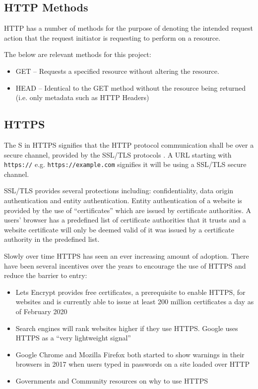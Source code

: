 \documentclass{mscreport}
\begin{document}
\subsection{HTTP Methods}

\noindent HTTP has a number of methods for the purpose of denoting the intended request action that the request initiator is requesting to perform on a resource.

\vspace{0.3cm} \noindent
The below are relevant methods for this project:
\begin{itemize}
	\setlength\itemsep{0.1em}
	\item GET – Requests a specified resource without altering the resource.
	\item HEAD – Identical to the GET method without the resource being returned (i.e. only metadata such as HTTP Headers)
\end{itemize}

\subsection{HTTPS}

\noindent
The S in HTTPS signifies that the HTTP protocol communication shall be over a secure channel, provided by the SSL/TLS protocols \cite{Rescorla2000-fs}. A URL starting with \texttt{https://} e.g. \texttt{https://example.com} signifies it will be using a SSL/TLS secure channel.

\vspace{0.3cm} \noindent 
SSL/TLS provides several protections including: confidentiality, data origin authentication and entity authentication. Entity authentication of a website is provided by the use of ``certificates'' which are issued by certificate authorities. A users' browser has a predefined list of certificate authorities that it trusts and a website certificate will only be deemed valid of it was issued by a certificate authority in the predefined list.


\vspace{0.3cm} \noindent
Slowly over time HTTPS has seen an ever increasing amount of adoption. There have been several incentives over the years to encourage the use of HTTPS and reduce the barrier to entry:

\begin{itemize}
	\setlength\itemsep{0.1em}
	\item Lets Encrypt provides free certificates, a prerequisite to enable HTTPS, for websites and is currently able to issue at least 200 million certificates a day as of February 2020 \cite{noauthor_undated-bi}
	\item Search engines will rank websites higher if they use HTTPS. Google uses HTTPS as a ``very lightweight signal'' \cite{noauthor_undated-im}
	\item Google Chrome and Mozilla Firefox both started to show warnings in their browsers in 2017 when users typed in passwords on a site loaded over HTTP \cite{Vyas2017-ds,Google_undated-ws}
	\item Governments and Community resources on why to use HTTPS \cite{noauthor_undated-oz,noauthor_undated-xk}
\end{itemize}
\end{document}
